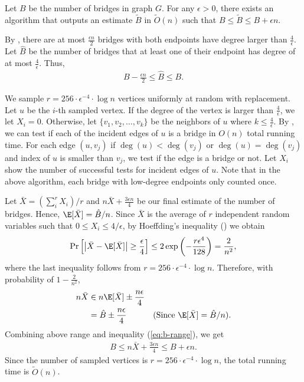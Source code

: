 \begin{lemma}\label{lem:bridge-estimator}
Let $B$ be the number of bridges in graph $G$. For any $\epsilon > 0$, there exists an algorithm that outputs an estimate $\tilde{B}$ in $\tilde{O}(n)$ such that $B \leq \tilde{B} \leq B + \epsilon n$.
\end{lemma}
\begin{myproof}
By , there are at most $\frac{\epsilon n}{2}$ bridges with both endpoints have degree larger than $\frac{4}{\epsilon}$. Let $\hat{B}$ be the number of bridges that at least one of their endpoint has degree of at most $\frac{4}{\epsilon}$. Thus,
\begin{align}\label{eq:b-range}
    B - \frac{\epsilon n}{2} \leq \hat{B} \leq B.
\end{align}

We sample $r = 256\cdot \epsilon^{-4} \cdot \log n$ vertices uniformly at random with replacement. Let $u$ be the $i$-th sampled vertex. If the degree of the vertex is larger than $\frac{4}{\epsilon}$, we let $X_i = 0$. Otherwise, let $\{v_1, v_2, \ldots, v_k\}$ be the neighbors of $u$ where $k \leq \frac{4}{\epsilon}$. By , we can test if each of the incident edges of $u$ is a bridge in $O(n)$ total running time. For each edge $(u, v_j)$ if $\deg(u) < \deg(v_j)$ or $\deg(u) = \deg(v_j)$ and index of $u$ is smaller than $v_j$, we test if the edge is a bridge or not. Let $X_i$ show the number of successful tests for incident edges of $u$. Note that in the above algorithm, each bridge with low-degree endpoints only counted once. 

Let $\bar{X} = (\sum_{i}^{r} X_i) / r$ and $n\bar{X} + \frac{3\epsilon n}{4}$ be our final estimate of the number of bridges. Hence, $\E[\bar{X}] = \hat{B}/n$. Since $\bar{X}$ is the average of $r$ independent random variables such that $0 \leq X_i \leq 4/\epsilon$, by Hoeffding's inequality () we obtain
\begin{align*}
    \Pr\left[\left|\bar{X} - \E[\bar{X}]\right| \geq \frac{\epsilon}{4}\right] \leq 2\exp\left(-\frac{r\epsilon^4}{128}\right) = \frac{2}{n^2},
\end{align*}
where the last inequality follows from $r = 256\cdot \epsilon^{-4} \cdot \log n$. Therefore, with probability of $1 - \frac{2}{n^2}$,
\begin{align*}
    n\bar{X} & \in n\E[\bar{X}] \pm \frac{n\epsilon}{4}\\
    & = \hat{B} \pm \frac{n\epsilon}{4} & (\text{Since } \E[\bar{X}] = \hat{B}/n).
\end{align*}
Combining above range and inequality (\ref{eq:b-range}), we get
\begin{align*}
    B\leq n\bar{X} + \frac{3\epsilon n}{4} \leq B + \epsilon n.
\end{align*}
Since the number of sampled vertices is $r = 256\cdot \epsilon^{-4} \cdot \log n$, the total running time is $\tilde{O}(n)$.
\end{myproof}

